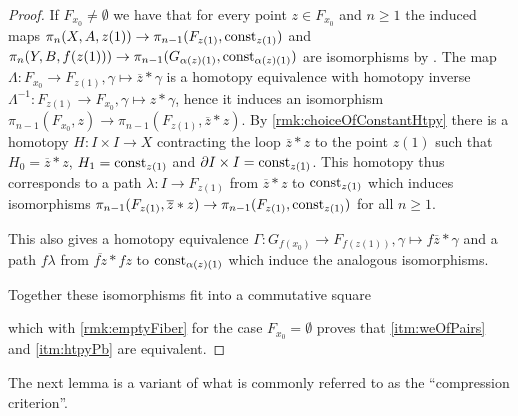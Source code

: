 \begin{lemma}
\begin{proof}
        If $F_{x_0}\neq\emptyset$ we have that for every point $z\in F_{x_0}$ and $n\geq 1$ the induced maps $\pi_n(X,A,z(1))\to \pi_{n-1}(F_{z(1)},\operatorname{const}_{z(1)})$ and $\pi_n(Y,B,f(z(1)))\to \pi_{n-1}(G_{\alpha(z)(1)},\operatorname{const}_{\alpha(z)(1)})$ are isomorphisms by \cite[Theorem 5.1.8]{lectures_htpy_thy}.
        The map $\Lambda\colon F_{x_0}\to F_{z(1)}, \gamma\mapsto \overline{z}*\gamma$ is a homotopy equivalence with homotopy inverse $\Lambda^{-1}\colon F_{z(1)}\to F_{x_0}, \gamma\mapsto z*\gamma$, hence it induces an isomorphism $\pi_{n-1}(F_{x_0},z)\to\pi_{n-1}(F_{z(1)},\overline{z}*z)$.
        By \cref{rmk:choiceOfConstantHtpy} there is a homotopy $H\colon I\times I\to X$ contracting the loop $\overline{z}*z$ to the point $z(1)$ such that $H_0=\overline{z}*z$, $H_1=\operatorname{const}_{z(1)}$ and $\partial I\times I=\operatorname{const}_{z(1)}$.
        This homotopy thus corresponds to a path $\lambda\colon I\to F_{z(1)}$ from $\overline{z}*z$ to $\operatorname{const}_{z(1)}$ which induces isomorphisms $\pi_{n-1}(F_{z(1)},\overline{z}*z)\to\pi_{n-1}(F_{z(1)},\operatorname{const}_{z(1)})$ for all $n\geq 1$.

        This also gives a homotopy equivalence $\Gamma\colon G_{f(x_0)}\to F_{f(z(1))}, \gamma\mapsto f\overline{z}*\gamma$ and a path $f\lambda$ from $\overline{fz}*fz$ to $\operatorname{const}_{\alpha(z)(1)}$ which induce the analogous isomorphisms.
        
        Together these isomorphisms fit into a commutative square
        \begin{center} 
        \end{center}
        which with \cref{rmk:emptyFiber} for the case $F_{x_0}=\emptyset$ proves that \ref{itm:weOfPairs} and \ref{itm:htpyPb} are equivalent.
    \end{proof}
\end{lemma}
The next lemma is a variant of what is commonly referred to as the ``compression criterion''.
